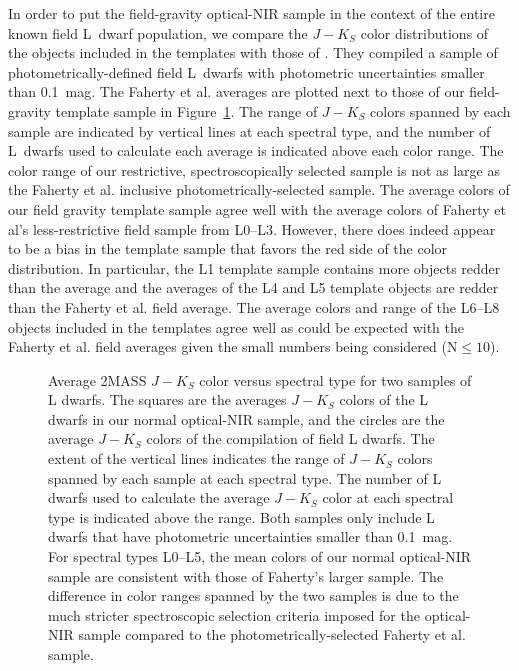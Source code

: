 \documentclass[12pt]{aastex6}
\begin{document}
In order to put the field-gravity optical-NIR sample in the context of the entire known field L~dwarf population, we compare the $J-K_S$ color distributions of the objects included in the templates with those of \citet{Faherty13_0355}.
They compiled a sample of photometrically-defined field L~dwarfs with photometric uncertainties smaller than 0.1~mag.
The Faherty et al. averages are plotted next to those of our field-gravity template sample in Figure~\ref{fig:JK_colors_F13}.
The range of $J-K_S$ colors spanned by each sample are indicated by vertical lines at each spectral type, and the number of L~dwarfs used to calculate each average is indicated above each color range.
The color range of our restrictive, spectroscopically selected sample is not as large as the Faherty et al. inclusive photometrically-selected sample.
The average colors of our field gravity template sample agree well with the average colors of Faherty et al's less-restrictive field sample from L0--L3.
However, there does indeed appear to be a bias in the template sample that favors the red side of the color distribution.
In particular, the L1 template sample contains more objects redder than the average and the averages of the L4 and L5 template objects are redder than the Faherty et al. field average.
The average colors and range of the L6--L8 objects included in the templates agree well as could be expected with the Faherty et al. field averages given the small numbers being considered (N$\le10$).

\begin{figure}
    \caption{Average 2MASS $J-K_S$ color versus spectral type for two samples of L dwarfs. The squares are the averages $J-K_S$ colors of the L dwarfs in our normal optical-NIR sample, and the circles are the average $J-K_S$ colors of the \citet{Faherty13_0355} compilation of field L dwarfs. The extent of the vertical lines indicates the range of $J-K_S$ colors spanned by each sample at each spectral type. The number of L dwarfs used to calculate the average $J-K_S$ color at each spectral type is indicated above the range. Both samples only include L dwarfs that have photometric uncertainties smaller than 0.1~mag. For spectral types L0--L5, the mean colors of our normal optical-NIR sample are consistent with those of Faherty's larger sample. The difference in color ranges spanned by the two samples is due to the much stricter spectroscopic selection criteria imposed for the optical-NIR sample compared to the photometrically-selected Faherty et al. sample.}
  \label{fig:JK_colors_F13}
\end{figure}
\end{document}

